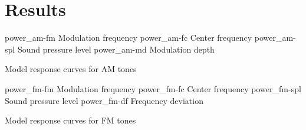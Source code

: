 \documentclass{article}
\begin{document}

\section{Results}

\myfigurequad%
  {power_am-fm}
  {Modulation frequency}
  {power_am-fc}
  {Center frequency}
  {power_am-spl}
  {Sound pressure level}
  {power_am-md}
  {Modulation depth}
  {
    \caption{Model response curves for AM tones}
    \label{fig:AM}
  }

\myfigurequad%
  {power_fm-fm}
  {Modulation frequency}
  {power_fm-fc}
  {Center frequency}
  {power_fm-spl}
  {Sound pressure level}
  {power_fm-df}
  {Frequency deviation}
  {
    \caption{Model response curves for FM tones}
    \label{fig:FM}
  }
\end{document}
